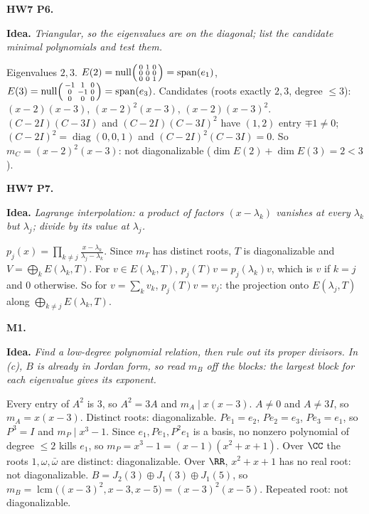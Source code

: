\documentclass[10pt]{scrartcl}
\DeclareMathOperator{\nul}{null}
\DeclareMathOperator{\spn}{span}
\newcommand{\idea}[1]{{\color{OliveGreen!75!black}\textbf{Idea.}} \textit{#1}\par}
\newenvironment{prob}{\par\medskip\noindent\begin{minipage}{\linewidth}\setlength{\parskip}{3pt}}{\end{minipage}\par}
\begin{document}
\begin{prob}
\textbf{HW7 P6. }\par 
\idea{Triangular, so the eigenvalues are on the diagonal; list the candidate minimal polynomials and test them.}
Eigenvalues $2,3$. $E(2)=\nul\begin{psmallmatrix}0&1&0\\0&0&0\\0&0&1\end{psmallmatrix}=\spn(e_1)$, $E(3)=\nul\begin{psmallmatrix}-1&1&0\\0&-1&0\\0&0&0\end{psmallmatrix}=\spn(e_3)$. Candidates (roots exactly $2,3$, degree $\le3$): $(x-2)(x-3)$, $(x-2)^2(x-3)$, $(x-2)(x-3)^2$. $(C-2I)(C-3I)$ and $(C-2I)(C-3I)^2$ have $(1,2)$ entry $\mp1\ne0$; $(C-2I)^2=\operatorname{diag}(0,0,1)$ and $(C-2I)^2(C-3I)=0$. So $m_C=(x-2)^2(x-3)$: not diagonalizable ($\dim E(2)+\dim E(3)=2<3$).
\end{prob}

\begin{prob}
\textbf{HW7 P7. }\par 
\idea{Lagrange interpolation: a product of factors $(x-\lambda_k)$ vanishes at every $\lambda_k$ but $\lambda_j$; divide by its value at $\lambda_j$.}
$p_j(x)=\prod_{k\ne j}\frac{x-\lambda_k}{\lambda_j-\lambda_k}$. Since $m_T$ has distinct roots, $T$ is diagonalizable and $V=\bigoplus_kE(\lambda_k,T)$. For $v\in E(\lambda_k,T)$, $p_j(T)v=p_j(\lambda_k)v$, which is $v$ if $k=j$ and $0$ otherwise. So for $v=\sum_kv_k$, $p_j(T)v=v_j$: the projection onto $E(\lambda_j,T)$ along $\bigoplus_{k\ne j}E(\lambda_k,T)$.
\end{prob}

\begin{prob}
\textbf{M1. }\par 
\idea{Find a low-degree polynomial relation, then rule out its proper divisors. In (c), $B$ is already in Jordan form, so read $m_B$ off the blocks: the largest block for each eigenvalue gives its exponent.}
\begin{enumerate}[(a)]
  \ii Every entry of $A^2$ is $3$, so $A^2=3A$ and $m_A\mid x(x-3)$. $A\ne0$ and $A\ne3I$, so $m_A=x(x-3)$. Distinct roots: diagonalizable.
  \ii $Pe_1=e_2$, $Pe_2=e_3$, $Pe_3=e_1$, so $P^3=I$ and $m_P\mid x^3-1$. Since $e_1,Pe_1,P^2e_1$ is a basis, no nonzero polynomial of degree $\le2$ kills $e_1$, so $m_P=x^3-1=(x-1)(x^2+x+1)$. Over $\CC$ the roots $1,\omega,\bar\omega$ are distinct: diagonalizable. Over $\RR$, $x^2+x+1$ has no real root: not diagonalizable.
  \ii $B=J_2(3)\oplus J_1(3)\oplus J_1(5)$, so $m_B=\operatorname{lcm}\big((x-3)^2,x-3,x-5\big)=(x-3)^2(x-5)$. Repeated root: not diagonalizable.
\end{enumerate}
\end{prob}
\end{document}
